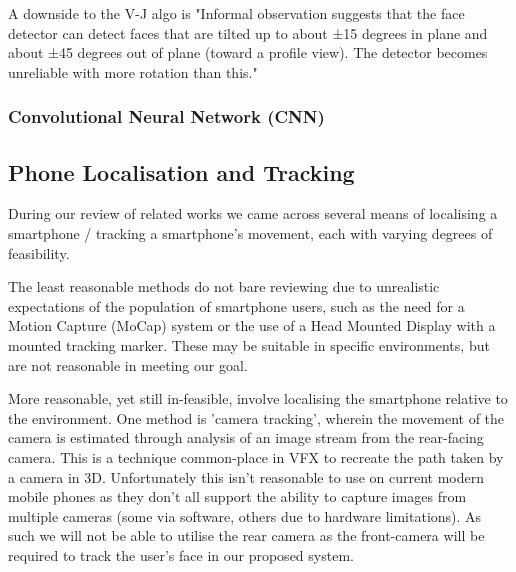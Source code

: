 A downside to the V-J algo is "Informal observation suggests that the face detector can detect faces that are tilted up to about ±15 degrees in plane and about ±45 degrees out of plane (toward a profile view). The detector becomes unreliable with more rotation than this."\cite{viola2004robust}


\subsubsection{Convolutional Neural Network (CNN)}\nl

\cite{yan2021fast}



\subsection{Phone Localisation and Tracking}
During our review of related works we came across several means of localising a smartphone / tracking a smartphone's movement, each with varying degrees of feasibility.

The least reasonable methods do not bare reviewing due to unrealistic expectations of the population of smartphone users, such as the need for a Motion Capture (MoCap) system\cite{buschel2017investigating} or the use of a Head Mounted Display with a mounted tracking marker\cite{mohr2019trackcap}.
These may be suitable in specific environments, but are not reasonable in meeting our goal.

More reasonable, yet still in-feasible, involve localising the smartphone relative to the environment.
One method is 'camera tracking', wherein the movement of the camera is estimated through analysis of an image stream from the rear-facing camera. This is a technique common-place in VFX to recreate the path taken by a camera in 3D.
Unfortunately this isn't reasonable to use on current modern mobile phones as they don't all support the ability to capture images from multiple cameras (some via software, others due to hardware limitations). As such we will not be able to utilise the rear camera as the front-camera will be required to track the user's face in our proposed system.

